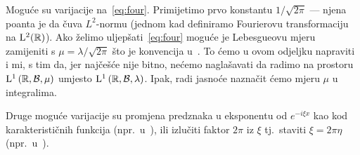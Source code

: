 \documentclass[main.tex]{subfiles}
\begin{document}
\begin{komentar}\label{kom:four1}
	Moguće su varijacije na~\eqref{eq:four}.
	Primijetimo prvo konstantu \( 1/\sqrt{2\pi} \) --- njena poanta je da čuva
	\( L^2 \)-normu (jednom kad definiramo Fourierovu transformaciju na \( \mathrm{L}^2(\mathbb{R}) \)).
	Ako želimo uljepšati~\eqref{eq:four} moguće je Lebesgueovu mjeru
	zamijeniti s \( \mu = \lambda/\sqrt{2\pi} \) što je konvencija
	u~\cite[]{rudin}. To ćemo u ovom odjeljku napraviti i mi,
	s tim da, jer najčešće nije bitno, nećemo naglašavati da radimo
	na prostoru \( \mathrm{L}^1\left( \mathbb{R}, \mathcal B, \mu \right) \) umjesto
	\( \mathrm{L}^1\left(\mathbb{R}, \mathcal B, \lambda \right) \). Ipak, radi jasnoće naznačit ćemo
	mjeru \( \mu \) u integralima.

	Druge moguće varijacije su promjena predznaka u eksponentu od
	\( e^{-i\xi x} \) kao kod karakterističnih funkcija (npr.\ u~\cite{fidta}), ili izlučiti faktor
	\( 2\pi \) iz \( \xi \) tj.\ staviti \( \xi = 2\pi\eta \) (npr.\ u~\cite{kovac-wroclaw}).
\end{komentar}
\end{document}
